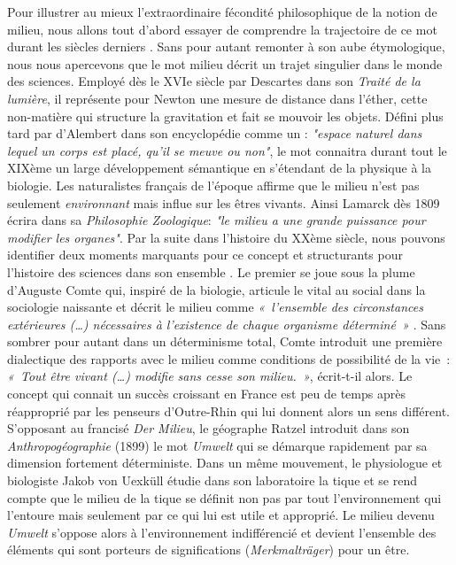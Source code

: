 Pour illustrer au mieux l’extraordinaire fécondité philosophique de la notion de milieu, nous allons tout d’abord essayer de comprendre la trajectoire de ce mot durant les siècles derniers \citep{Canguilhem1965}. Sans pour autant remonter à son aube étymologique, nous nous apercevons que le mot milieu décrit un trajet singulier dans le monde des sciences. Employé dès le XVIe siècle par Descartes dans son \textit{Traité de la lumière}, il représente pour Newton une mesure de distance dans l’éther, cette non-matière qui structure la gravitation et fait se mouvoir les objets. Défini plus tard par d'Alembert dans son encyclopédie comme un : \textit{"espace naturel dans lequel un corps est placé, qu'il se meuve ou non"}, le mot connaitra durant tout le XIXème un large développement sémantique en s'étendant de la physique à la biologie. Les naturalistes français de l’époque affirme que le milieu n’est pas seulement \textit{environnant} mais influe sur les êtres vivants. Ainsi Lamarck dès 1809 écrira dans sa \textit{Philosophie Zoologique}: \textit{"le milieu a une grande puissance pour modifier les organes"}. Par la suite dans l’histoire du XXème siècle, nous pouvons identifier deux moments marquants pour ce concept et structurants pour l’histoire des sciences dans son ensemble \citep{Taylan2010}. 
Le premier se joue sous la plume d’Auguste Comte qui, inspiré de la biologie, articule le vital au social dans la sociologie naissante et décrit le milieu comme \textit{« l’ensemble des circonstances extérieures (…) nécessaires à l’existence de chaque organisme déterminé »} \citep{Comte1838}. Sans sombrer pour autant dans un déterminisme total, Comte introduit une première dialectique des rapports avec le milieu comme conditions de possibilité de la vie : \textit{« Tout être vivant (…) modifie sans cesse son milieu. »}, écrit-t-il alors. 
Le concept qui connait un succès croissant en France est peu de temps après réapproprié par les penseurs d’Outre-Rhin qui lui donnent alors un sens différent. S’opposant au francisé \textit{Der Milieu}, le géographe Ratzel introduit dans son \textit{Anthropogéographie} (1899) le mot \textit{Umwelt} qui se démarque rapidement par sa dimension fortement déterministe. Dans un même mouvement, le physiologue et biologiste Jakob von Uexküll étudie dans son laboratoire la tique et se rend compte que le milieu de la tique se définit non pas par tout l’environnement qui l’entoure mais seulement par ce qui lui est utile et approprié. Le milieu devenu \textit{Umwelt} s’oppose alors à l’environnement indifférencié et devient l’ensemble des éléments qui sont porteurs de significations (\textit{Merkmalträger}) pour un être. 
